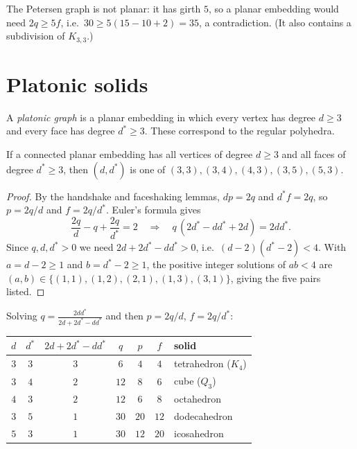 \begin{example}
The Petersen graph is not planar: it has girth $5$, so a planar embedding would need
$2q \ge 5f$, i.e.\ $30 \ge 5(15 - 10 + 2) = 35$, a contradiction. (It also contains a subdivision
of $K_{3,3}$.)
\end{example}

\section{Platonic solids}

A \emph{platonic graph} is a planar embedding in which every vertex has degree $d \ge 3$ and every
face has degree $d^* \ge 3$. These correspond to the regular polyhedra.

\begin{theorem}
If a connected planar embedding has all vertices of degree $d\ge3$ and all faces of degree
$d^*\ge3$, then $(d,d^*)$ is one of $(3,3), (3,4), (4,3), (3,5), (5,3)$.
\end{theorem}
\begin{proof}
By the handshake and faceshaking lemmas, $dp = 2q$ and $d^*f = 2q$, so $p = 2q/d$ and $f = 2q/d^*$.
Euler's formula gives
\[
\frac{2q}{d} - q + \frac{2q}{d^*} = 2
\quad\Longrightarrow\quad
q\,(2d^* - dd^* + 2d) = 2dd^*.
\]
Since $q, d, d^* > 0$ we need $2d + 2d^* - dd^* > 0$, i.e.\ $(d-2)(d^*-2) < 4$. With $a = d-2\ge1$
and $b = d^*-2 \ge 1$, the positive integer solutions of $ab < 4$ are
$(a,b) \in \{(1,1),(1,2),(2,1),(1,3),(3,1)\}$, giving the five pairs listed.
\end{proof}

Solving $q = \frac{2dd^*}{2d+2d^*-dd^*}$ and then $p = 2q/d$, $f = 2q/d^*$:

\begin{center}
\begin{tabular}{ccccccl}
\toprule
$d$ & $d^*$ & $2d + 2d^* - dd^*$ & $q$ & $p$ & $f$ & solid \\
\midrule
$3$ & $3$ & $3$ & $6$ & $4$ & $4$ & tetrahedron ($K_4$)\\
$3$ & $4$ & $2$ & $12$ & $8$ & $6$ & cube ($Q_3$)\\
$4$ & $3$ & $2$ & $12$ & $6$ & $8$ & octahedron\\
$3$ & $5$ & $1$ & $30$ & $20$ & $12$ & dodecahedron\\
$5$ & $3$ & $1$ & $30$ & $12$ & $20$ & icosahedron\\
\bottomrule
\end{tabular}
\end{center}

